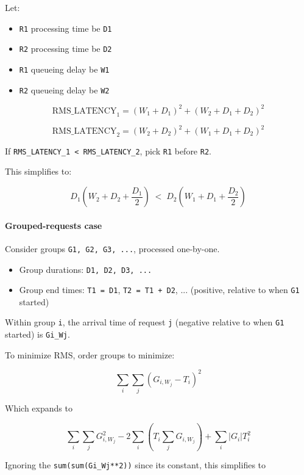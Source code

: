 \documentclass{article}
\providecommand{\tightlist}{\setlength{\itemsep}{0pt}\setlength{\parskip}{0pt}}
\begin{document}
Let:

\begin{itemize}
\tightlist
\item
  \texttt{R1} processing time be \texttt{D1}
\item
  \texttt{R2} processing time be \texttt{D2}
\item
  \texttt{R1} queueing delay be \texttt{W1}
\item
  \texttt{R2} queueing delay be \texttt{W2}
\end{itemize}

\[
\mathrm{RMS\_LATENCY}_1
= (W_1 + D_1)^2 + (W_2 + D_1 + D_2)^2
\]

\[
\mathrm{RMS\_LATENCY}_2
= (W_2 + D_2)^2 + (W_1 + D_1 + D_2)^2
\]

If \texttt{RMS\_LATENCY\_1\ \textless{}\ RMS\_LATENCY\_2}, pick
\texttt{R1} before \texttt{R2}.

This simplifies to:

\[
D_1\!\left(W_2 + D_2 + \frac{D_1}{2}\right)
\;<\;
D_2\!\left(W_1 + D_1 + \frac{D_2}{2}\right)
\]

\hypertarget{grouped-requests-case}{%
\paragraph{Grouped-requests case}\label{grouped-requests-case}}

Consider groups \texttt{G1,\ G2,\ G3,\ ...}, processed one-by-one.

\begin{itemize}
\tightlist
\item
  Group durations: \texttt{D1,\ D2,\ D3,\ ...}
\item
  Group end times: \texttt{T1\ =\ D1}, \texttt{T2\ =\ T1\ +\ D2}, ...
  (positive, relative to when \texttt{G1} started)
\end{itemize}

Within group \texttt{i}, the arrival time of request \texttt{j}
(negative relative to when \texttt{G1} started) is \texttt{Gi\_Wj}.

To minimize RMS, order groups to minimize:

\[
\sum_i \sum_j (G_{i,W_j} - T_i)^2
\]

Which expands to

\[
\sum_i \sum_j G_{i,W_j}^2
- 2\sum_i\!\left(T_i \sum_j G_{i,W_j}\right)
+ \sum_i |G_i|T_i^2
\]

Ignoring the \texttt{sum(sum(Gi\_Wj**2))} since it\textquotesingle s
constant, this simplifies to
\end{document}
